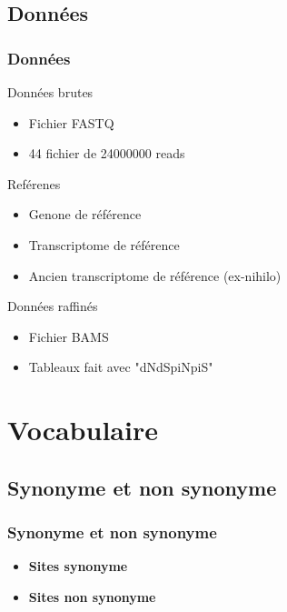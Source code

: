 \subsection{Données}
\begin{frame}
    \frametitle{Données}
    \begin{block}{Données brutes}
        \begin{itemize}
            \item Fichier FASTQ
            \item 44 fichier de \num{24 000 000} reads
            
        \end{itemize}
    \end{block}

    \pause
    
    \begin{block}{Reférenes}
        \begin{itemize}
            \item Genone de référence
            \item Transcriptome de référence
            \item Ancien transcriptome de référence (ex-nihilo)
            
        \end{itemize}
    \end{block}

    \pause
    
    \begin{block}{Données raffinés}
        \begin{itemize}
            \item Fichier BAMS
            \item Tableaux fait avec "dNdSpiNpiS" \cite{dNdSpNpS}
        \end{itemize}
    \end{block}
\end{frame}


\section{Vocabulaire}
\begin{frame}
	\tableofcontents[sectionstyle=show/shaded,subsectionstyle=show/show/hide,subsubsectionstyle=show/show/hide]
\end{frame}

\subsection{Synonyme et non synonyme}
\begin{frame}
    \frametitle{Synonyme et non synonyme}
    

    \pause
    \small
    \begin{itemize}
        \item \textbf{Sites synonyme}
        \item \textbf{Sites non synonyme}
    \end{itemize}

\end{frame}





